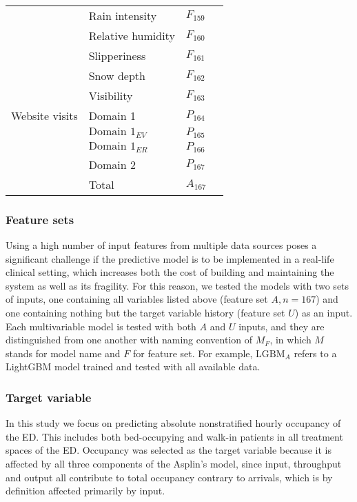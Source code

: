 \begin{table}[p]
\begin{tabular}[t]{ llll }
	& Rain intensity & $F_{159}$ \\
	& Relative humidity & $F_{160}$ \\
	& Slipperiness & $F_{161}$ \\
	& Snow depth & $F_{162}$ \\
	& Visibility & $F_{163}$ \\
	Website visits & Domain 1 & $P_{164}$ \\
	& $\text{Domain 1}_{EV}$ & $P_{165}$ \\
	& $\text{Domain 1}_{ER}$ & $P_{166}$ \\
	& Domain 2 & $P_{167}$ \\
	\hline
	& Total & $A_{167}$ \\
	\hline
	\end{tabular}
\end{table}

\subsubsection{Feature sets}

Using a high number of input features from multiple data sources poses a significant challenge if the predictive model is to be implemented in a real-life clinical setting, which increases both the cost of building and maintaining the system as well as its fragility. For this reason, we tested the models with two sets of inputs, one containing all variables listed above (feature set $A, n = 167$) and one containing  nothing but the target variable history (feature set $U$) as an input. Each multivariable model is tested with both $A$ and $U$ inputs, and they are distinguished from one another with naming convention of {$M_F$}, in which $M$ stands for model name and $F$ for feature set. For example, $\text{LGBM}_A$ refers to a LightGBM model trained and tested with all available data.

\subsubsection{Target variable}\label{sec:dependent_variables}
In this study we focus on predicting absolute nonstratified hourly occupancy of the ED. This includes both bed-occupying and walk-in patients in all treatment spaces of the ED. Occupancy was selected as the target variable because it is affected by all three components of the Asplin's model, since input, throughput and output all contribute to total occupancy contrary to arrivals, which is by definition affected primarily by input.


